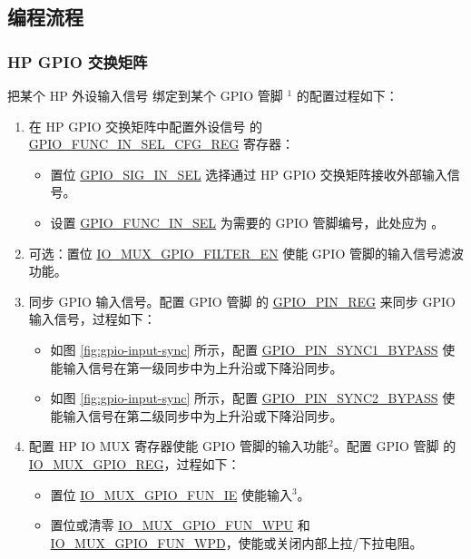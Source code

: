 \documentclass[main\_\_CN.tex]{subfiles}
\begin{document}
\subsection{编程流程}
\label{sec:functional-description}
\subsubsection{HP GPIO 交换矩阵}
\label{sec:prgramming-procedure-for-hp}
把某个 HP 外设输入信号  绑定到某个 GPIO 管脚 \hyperref[input-note-1]{$^1$} 的配置过程如下：

\begin{enumerate}
    \item 在 HP GPIO 交换矩阵中配置外设信号  的 \hyperref[regdesc:GPIOFUNCMINSELCFGREG]{GPIO\_FUNC\_IN\_SEL\_CFG\_REG} 寄存器：
    \begin{itemize}
        \item 置位 \hyperref[fielddesc:GPIOSIGNINSEL]{GPIO\_SIG\_IN\_SEL} 选择通过 HP GPIO 交换矩阵接收外部输入信号。
        \item 设置 \hyperref[fielddesc:GPIOFUNCMINSEL]{GPIO\_FUNC\_IN\_SEL} 为需要的 GPIO 管脚编号，此处应为 。
    \end{itemize}
    \item \label{step:2} 可选：置位 \hyperref[fielddesc:IOMUXGPIONFILTEREN]{IO\_MUX\_GPIO\_FILTER\_EN} 使能 GPIO 管脚的输入信号滤波功能。
    \item \label{step:4} 同步 GPIO 输入信号。配置 GPIO 管脚  的 \hyperref[regdesc:GPIOPINNREG]{GPIO\_PIN\_REG} 来同步 GPIO 输入信号，过程如下：
    \begin{itemize}
        \item 如图 \ref{fig:gpio-input-sync} 所示，配置 \hyperref[fielddesc:GPIOPINNSYNC1BYPASS]{GPIO\_PIN\_SYNC1\_BYPASS} 使能输入信号在第一级同步中为上升沿或下降沿同步。
        \item 如图 \ref{fig:gpio-input-sync} 所示，配置 \hyperref[fielddesc:GPIOPINNSYNC2BYPASS]{GPIO\_PIN\_SYNC2\_BYPASS} 使能输入信号在第二级同步中为上升沿或下降沿同步。
    \end{itemize}
    \item 配置 HP IO MUX 寄存器使能 GPIO 管脚的输入功能\hyperref[input-note-2]{$^2$}。配置 GPIO 管脚  的 \hyperref[regdesc:IOMUXGPIONREG]{IO\_MUX\_GPIO\_REG}，过程如下：
    \begin{itemize}
        \item 置位 \hyperref[fielddesc:IOMUXGPIONFUNIE]{IO\_MUX\_GPIO\_FUN\_IE} 使能输入\hyperref[input-note-3]{$^3$}。
        \item 置位或清零 \hyperref[fielddesc:IOMUXGPIONFUNWPU]{IO\_MUX\_GPIO\_FUN\_WPU} 和 \hyperref[fielddesc:IOMUXGPIONFUNWPD]{IO\_MUX\_GPIO\_FUN\_WPD}，使能或关闭内部上拉/下拉电阻。
    \end{itemize}
\end{enumerate}
\end{document}
